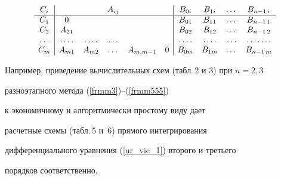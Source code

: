 \begin{eqnarray*}


\begin{array}{c|ccccc|cccc}


C_{i} & & & A_{ij} & & &B_{0i} &B_{1i}&\dotsc&B_{n-1\,i} \\


\hline


C_{1} & 0 & & & & &B_{01} &B_{11}&\dotsc&B_{n-1\,1} \\


C_{2} & A_{21} & & & & &B_{02} &B_{12}&\dotsc&B_{n-1\,2} \\


\dotfill &\dotfill &\dotfill &\dotfill & & &\dotfill &\dotfill &\dotfill&\dotfill \\


C_{m} &A_{m1} & A_{m2} &\dotsc & A_{m,m-1} & 0 &B_{0m} &B_{1m}&\dotsc&B_{n-1\,m} 


\end{array}


\end{eqnarray*}


 


Например, приведение вычислительных схем (табл.\,2 и 3) при $n=2,3$


разноэтапного метода (\ref{frmm3})--(\ref{frmm555})


к экономичному и алгоритмически простому виду дает


расчетные схемы (табл.\,5 и~6) прямого интегрирования


дифференциального уравнения (\ref{ur_vic_1}) второго и третьего 


порядков соответственно.


\medskip





